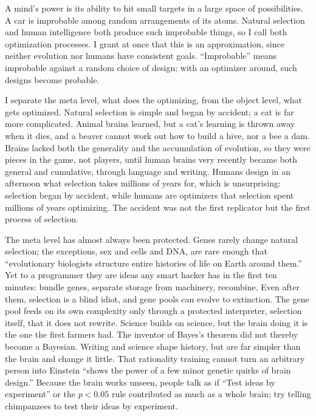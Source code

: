 
A mind's power is its ability to hit small targets in a large space of possibilities. A car is improbable among random arrangements of its atoms. Natural selection and human intelligence both produce such improbable things, so I call both optimization processes. I grant at once that this is an approximation, since neither evolution nor humans have consistent goals. ``Improbable'' means improbable against a random choice of design; with an optimizer around, such designs become probable.

I separate the meta level, what does the optimizing, from the object level, what gets optimized. Natural selection is simple and began by accident; a cat is far more complicated. Animal brains learned, but a cat's learning is thrown away when it dies, and a beaver cannot work out how to build a hive, nor a bee a dam. Brains lacked both the generality and the accumulation of evolution, so they were pieces in the game, not players, until human brains very recently became both general and cumulative, through language and writing. Humans design in an afternoon what selection takes millions of years for, which is unsurprising: selection began by accident, while humans are optimizers that selection spent millions of years optimizing. The accident was not the first replicator but the first process of selection.

The meta level has almost always been protected. Genes rarely change natural selection; the exceptions, sex and cells and DNA, are rare enough that ``evolutionary biologists structure entire histories of life on Earth around them.'' Yet to a programmer they are ideas any smart hacker has in the first ten minutes: bundle genes, separate storage from machinery, recombine. Even after them, selection is a blind idiot, and gene pools can evolve to extinction. The gene pool feeds on its own complexity only through a protected interpreter, selection itself, that it does not rewrite.  Science builds on science, but the brain doing it is the one the first farmers had. The inventor of Bayes's theorem did not thereby become a Bayesian. Writing and science shape history, but are far simpler than the brain and change it little. That rationality training cannot turn an arbitrary person into Einstein ``shows the power of a few minor genetic quirks of brain design.''  Because the brain works unseen, people talk as if ``Test ideas by experiment'' or the $p < 0.05$ rule contributed as much as a whole brain; try telling chimpanzees to test their ideas by experiment.

